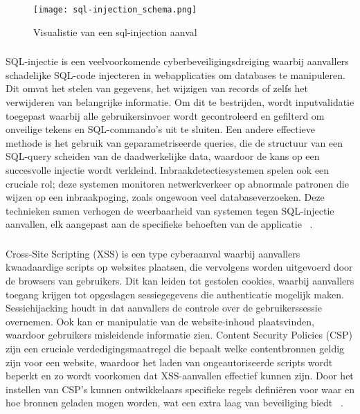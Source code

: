 \begin{figure}
    \centering
    \texttt{[image: sql-injection\_schema.png]}
    \caption[Visualistie van een sql-injection aanval]{Visualistie van een sql-injection aanval}
\end{figure}
\subsubsection{}
\label{sec:SQL-injectie}

SQL-injectie is een veelvoorkomende cyberbeveiligingsdreiging waarbij aanvallers schadelijke SQL-code injecteren in webapplicaties om databases te manipuleren. 
Dit omvat het stelen van gegevens, het wijzigen van records of zelfs het verwijderen van belangrijke informatie. Om dit te bestrijden, wordt inputvalidatie 
toegepast waarbij alle gebruikersinvoer wordt gecontroleerd en gefilterd om onveilige tekens en SQL-commando's uit te sluiten. Een andere effectieve methode 
is het gebruik van geparametriseerde queries, die de structuur van een SQL-query scheiden van de daadwerkelijke data, waardoor de kans op een succesvolle 
injectie wordt verkleind. Inbraakdetectiesystemen spelen ook een cruciale rol; deze systemen monitoren netwerkverkeer op abnormale patronen die wijzen op 
een inbraakpoging, zoals ongewoon veel databaseverzoeken. Deze technieken samen verhogen de weerbaarheid van systemen tegen SQL-injectie aanvallen, elk 
aangepast aan de specifieke behoeften van de applicatie ~\autocite{Abdullayev2023}.

\subsubsection{}
\label{sec:Cross-Site Scripting (XSS)}

Cross-Site Scripting (XSS) is een type cyberaanval waarbij aanvallers kwaadaardige scripts op websites plaatsen, die vervolgens worden uitgevoerd door de 
browsers van gebruikers. Dit kan leiden tot gestolen cookies, waarbij aanvallers toegang krijgen tot opgeslagen sessiegegevens die authenticatie mogelijk 
maken. Sessiehijacking houdt in dat aanvallers de controle over de gebruikerssessie overnemen. Ook kan er manipulatie van de website-inhoud plaatsvinden, 
waardoor gebruikers misleidende informatie zien. Content Security Policies (CSP) zijn een cruciale verdedigingsmaatregel die bepaalt welke contentbronnen 
geldig zijn voor een website, waardoor het laden van ongeautoriseerde scripts wordt beperkt en zo wordt voorkomen dat XSS-aanvallen effectief kunnen zijn. 
Door het instellen van CSP's kunnen ontwikkelaars specifieke regels definiëren voor waar en hoe bronnen geladen mogen worden, wat een extra laag van beveiliging
biedt ~\autocite{Weamie2022}.

